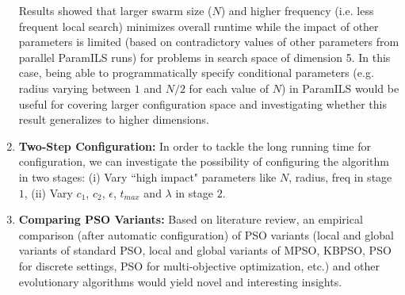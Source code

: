 \begin{enumerate}
Results showed that larger swarm size ($N$) and higher frequency (i.e. less frequent local search) minimizes overall runtime while the impact of other parameters is limited (based on contradictory values of other parameters from parallel ParamILS runs) for problems in search space of dimension 5. In this case, being able to programmatically specify conditional parameters (e.g. radius varying between $1$ and $N/2$ for each value of $N$) in ParamILS would be useful for covering larger configuration space and investigating whether this result generalizes to higher dimensions.

\item \textbf{Two-Step Configuration:} In order to tackle the long running time for configuration, we can investigate the possibility of configuring the algorithm in two stages: (i) Vary ``high impact" parameters like $N$, radius, freq in stage $1$, (ii) Vary $c_1$, $c_2$, $\epsilon$, $t_{max}$ and $\lambda$ in stage $2$. 

\item \textbf{Comparing PSO Variants:} Based on literature review, an empirical comparison (after automatic configuration) of PSO variants (local and global variants of standard PSO, local and global variants of MPSO, KBPSO, PSO for discrete settings, PSO for multi-objective optimization, etc.) and other evolutionary algorithms would yield novel and interesting insights.

\end{enumerate}